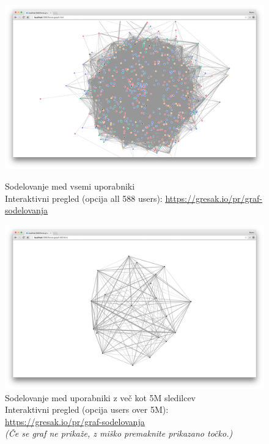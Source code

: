 \documentclass[a4paper,11pt]{article}
\begin{document}
\begin{figure}[htbp]
  \begin{center}
    \includegraphics[width=\textwidth,height=\textheight,keepaspectratio]{figures/collaborations-all.png}
    \caption{Sodelovanje med vsemi uporabniki\\
    Interaktivni pregled (opcija all 588 users): \href{https://gresak.io/pr/graf-sodelovanja}{\underline{https://gresak.io/pr/graf-sodelovanja}}}
    \includegraphics[width=\textwidth,height=\textheight,keepaspectratio]{figures/collaborations-over-5M.png}
    \caption{Sodelovanje med uporabniki z več kot 5M sledilcev\\
    Interaktivni pregled (opcija users over 5M): \href{https://gresak.io/pr/graf-sodelovanja}{\underline{https://gresak.io/pr/graf-sodelovanja}}\\
    \textit{(Če se graf ne prikaže, z miško premaknite prikazano točko.)}}
  \end{center}
\end{figure}
\end{document}
